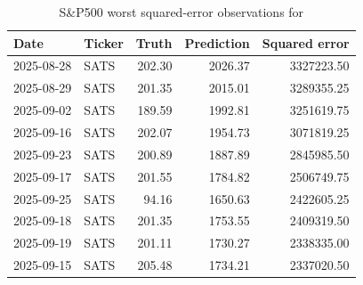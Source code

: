 
\begin{table}[H]
\centering
\caption{S\&P500 worst squared-error observations for }
\label{tab:wst-ghar3h-q-iv}
\scriptsize
\begin{tabular}{llrrr}
\toprule
Date & Ticker & Truth & Prediction & Squared error \\
\midrule
2025-08-28 & SATS & 202.30 & 2026.37 & 3327223.50 \\
2025-08-29 & SATS & 201.35 & 2015.01 & 3289355.25 \\
2025-09-02 & SATS & 189.59 & 1992.81 & 3251619.75 \\
2025-09-16 & SATS & 202.07 & 1954.73 & 3071819.25 \\
2025-09-23 & SATS & 200.89 & 1887.89 & 2845985.50 \\
2025-09-17 & SATS & 201.55 & 1784.82 & 2506749.75 \\
2025-09-25 & SATS & 94.16 & 1650.63 & 2422605.25 \\
2025-09-18 & SATS & 201.35 & 1753.55 & 2409319.50 \\
2025-09-19 & SATS & 201.11 & 1730.27 & 2338335.00 \\
2025-09-15 & SATS & 205.48 & 1734.21 & 2337020.50 \\

\bottomrule
\end{tabular}
\end{table}
